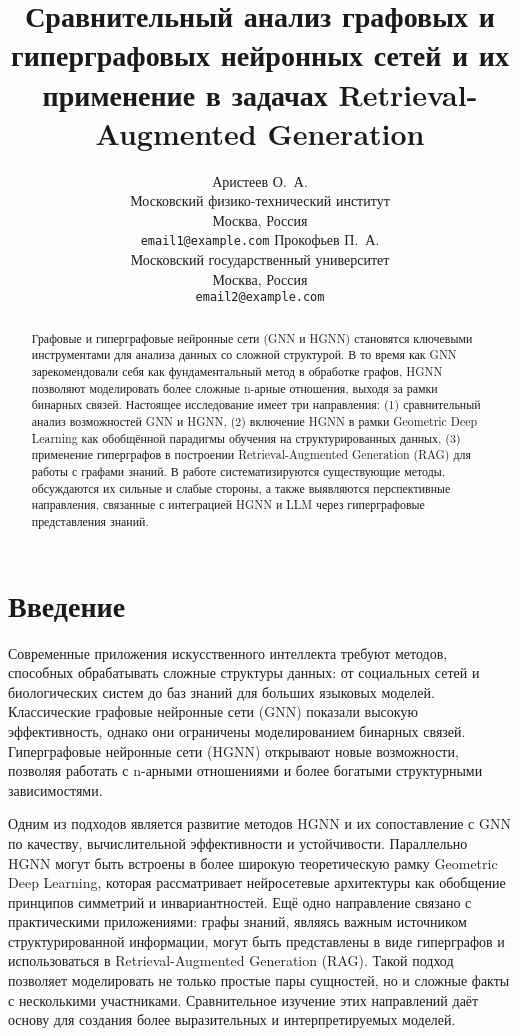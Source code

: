 \documentclass{article}
\title{Сравнительный анализ графовых и гиперграфовых нейронных сетей и их применение в задачах Retrieval-Augmented Generation}
\author{
  Аристеев О.~А. \\
  Московский физико-технический институт \\
  Москва, Россия \\
  \texttt{email1@example.com} 
  \And
  Прокофьев П.~А. \\
  Московский государственный университет \\
  Москва, Россия \\
  \texttt{email2@example.com} 
}
\date{}
\begin{document}
\maketitle

\begin{abstract}
Графовые и гиперграфовые нейронные сети (GNN и HGNN) становятся ключевыми инструментами для анализа данных со сложной структурой. В то время как GNN зарекомендовали себя как фундаментальный метод в обработке графов, HGNN позволяют моделировать более сложные n-арные отношения, выходя за рамки бинарных связей. Настоящее исследование имеет три направления: (1) сравнительный анализ возможностей GNN и HGNN, (2) включение HGNN в рамки Geometric Deep Learning как обобщённой парадигмы обучения на структурированных данных, (3) применение гиперграфов в построении Retrieval-Augmented Generation (RAG) для работы с графами знаний. В работе систематизируются существующие методы, обсуждаются их сильные и слабые стороны, а также выявляются перспективные направления, связанные с интеграцией HGNN и LLM через гиперграфовые представления знаний.
\end{abstract}


\section{Введение}

Современные приложения искусственного интеллекта требуют методов, способных обрабатывать сложные структуры данных: от социальных сетей и биологических систем до баз знаний для больших языковых моделей. Классические графовые нейронные сети (GNN) показали высокую эффективность, однако они ограничены моделированием бинарных связей. Гиперграфовые нейронные сети (HGNN) открывают новые возможности, позволяя работать с n-арными отношениями и более богатыми структурными зависимостями.

Одним из подходов является развитие методов HGNN и их сопоставление с GNN по качеству, вычислительной эффективности и устойчивости. Параллельно HGNN могут быть встроены в более широкую теоретическую рамку Geometric Deep Learning, которая рассматривает нейросетевые архитектуры как обобщение принципов симметрий и инвариантностей. Ещё одно направление связано с практическими приложениями: графы знаний, являясь важным источником структурированной информации, могут быть представлены в виде гиперграфов и использоваться в Retrieval-Augmented Generation (RAG). Такой подход позволяет моделировать не только простые пары сущностей, но и сложные факты с несколькими участниками. Сравнительное изучение этих направлений даёт основу для создания более выразительных и интерпретируемых моделей.
\end{document}
